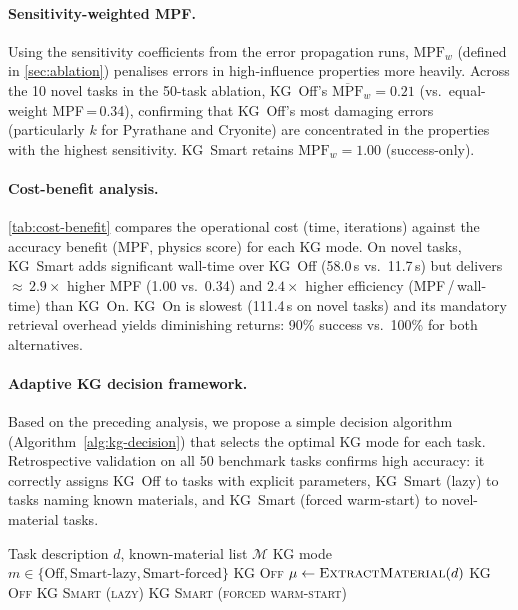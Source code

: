 \documentclass[twocolumn]{article}
\begin{document}
\paragraph{Sensitivity-weighted MPF.}
Using the sensitivity coefficients from the error propagation runs,
$\text{MPF}_w$ (defined in \cref{sec:ablation}) penalises errors in
high-influence properties more heavily.  Across the 10 novel tasks in
the 50-task ablation, KG~Off's $\overline{\text{MPF}}_w{=}0.21$
(vs.\ equal-weight MPF\,=\,0.34), confirming that KG~Off's most
damaging errors (particularly $k$ for Pyrathane and Cryonite) are
concentrated in the properties with the highest sensitivity.
KG~Smart retains $\text{MPF}_w{=}1.00$ (success-only).

\paragraph{Cost-benefit analysis.}
\cref{tab:cost-benefit} compares the operational cost (time, iterations)
against the accuracy benefit (MPF, physics score) for each KG mode.
On novel tasks, KG~Smart adds significant wall-time over KG~Off
(58.0\,s vs.\ 11.7\,s) but delivers ${\approx}\,2.9\times$ higher
MPF (1.00 vs.\ 0.34) and $2.4\times$ higher efficiency
(MPF\,/\,wall-time) than KG~On.  KG~On is slowest (111.4\,s on novel
tasks) and its mandatory retrieval overhead yields diminishing returns:
90\% success vs.\ 100\% for both alternatives.



\paragraph{Adaptive KG decision framework.}
Based on the preceding analysis, we propose a simple decision algorithm
(Algorithm~\ref{alg:kg-decision}) that selects the optimal KG mode for
each task.  Retrospective validation on all 50 benchmark tasks
confirms high accuracy: it correctly assigns KG~Off to tasks with
explicit parameters, KG~Smart (lazy) to tasks naming known materials,
and KG~Smart (forced warm-start) to novel-material tasks.

\begin{algorithm}[t]
\caption{Adaptive KG Mode Selection}
\label{alg:kg-decision}
\begin{algorithmic}[1]
\Require Task description $d$, known-material list $\mathcal{M}$
\Ensure KG mode $m \in \{\text{Off}, \text{Smart-lazy}, \text{Smart-forced}\}$
  \State \Return \textsc{KG Off}
\EndIf
\State $\mu \gets \textsc{ExtractMaterial}(d)$
\If{$\mu = \varnothing$}
  \State \Return \textsc{KG Off}
  \State \Return \textsc{KG Smart (lazy)}
\Else
  \State \Return \textsc{KG Smart (forced warm-start)}
\EndIf
\end{algorithmic}
\end{algorithm}
\end{document}
